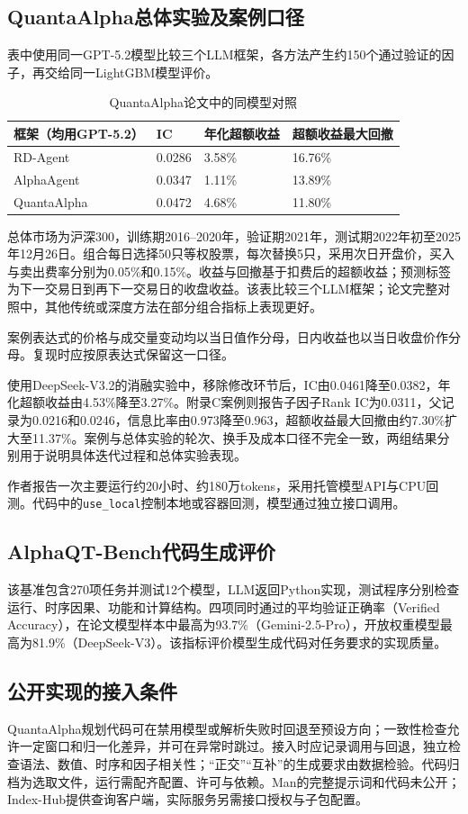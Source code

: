 \subsection{QuantaAlpha总体实验及案例口径}
表中使用同一GPT-5.2模型比较三个LLM框架，各方法产生约150个通过验证的因子，再交给同一LightGBM模型评价。

\begin{table}[H]\small\centering
\caption{QuantaAlpha论文中的同模型对照}\label{tab:qa}
\begin{tabularx}{\linewidth}{@{}P{43mm}Y Y Y@{}}\toprule
框架（均用GPT-5.2） & IC & 年化超额收益 & 超额收益最大回撤\\\midrule
RD-Agent & 0.0286 & 3.58\% & 16.76\%\\
AlphaAgent & 0.0347 & 1.11\% & 13.89\%\\
QuantaAlpha & 0.0472 & 4.68\% & 11.80\%\\\bottomrule
\end{tabularx}
\end{table}
总体市场为沪深300，训练期2016--2020年，验证期2021年，测试期2022年初至2025年12月26日。组合每日选择50只等权股票，每次替换5只，采用次日开盘价，买入与卖出费率分别为0.05\%和0.15\%。收益与回撤基于扣费后的超额收益；预测标签为下一交易日到再下一交易日的收盘收益。该表比较三个LLM框架；论文完整对照中，其他传统或深度方法在部分组合指标上表现更好。

案例表达式的价格与成交量变动均以当日值作分母，日内收益也以当日收盘价作分母。复现时应按原表达式保留这一口径。

使用DeepSeek-V3.2的消融实验中，移除修改环节后，IC由0.0461降至0.0382，年化超额收益由4.53\%降至3.27\%。附录C案例则报告子因子Rank IC为0.0311，父记录为0.0216和0.0246，信息比率由0.973降至0.963，超额收益最大回撤由约7.30\%扩大至11.37\%。案例与总体实验的轮次、换手及成本口径不完全一致，两组结果分别用于说明具体迭代过程和总体实验表现。

作者报告一次主要运行约20小时、约180万tokens，采用托管模型API与CPU回测。代码中的\texttt{use\_local}控制本地或容器回测，模型通过独立接口调用。

\subsection{AlphaQT-Bench代码生成评价}
该基准包含270项任务并测试12个模型，LLM返回Python实现，测试程序分别检查运行、时序因果、功能和计算结构。四项同时通过的平均验证正确率（Verified Accuracy），在论文模型样本中最高为93.7\%（Gemini-2.5-Pro），开放权重模型最高为81.9\%（DeepSeek-V3）。该指标评价模型生成代码对任务要求的实现质量。


\subsection{公开实现的接入条件}
QuantaAlpha规划代码可在禁用模型或解析失败时回退至预设方向；一致性检查允许一定窗口和归一化差异，并可在异常时跳过。接入时应记录调用与回退，独立检查语法、数值、时序和因子相关性；“正交”“互补”的生成要求由数据检验。代码归档为选取文件，运行需配齐配置、许可与依赖。Man的完整提示词和代码未公开；Index-Hub提供查询客户端，实际服务另需接口授权与子包配置。
